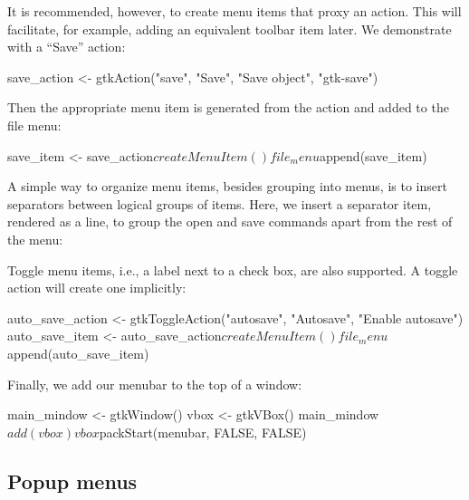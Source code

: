 It is recommended, however, to create menu items that proxy an
action. This will facilitate, for example, adding an equivalent
toolbar item later. We demonstrate with a ``Save'' action:
\begin{Schunk}
\begin{Sinput}
 save_action <- 
   gtkAction("save", "Save", "Save object", "gtk-save")
\end{Sinput}
\end{Schunk}
%
Then the appropriate menu item is generated from the action and added
to the file menu:
\begin{Schunk}
\begin{Sinput}
 save_item <- save_action$createMenuItem()
 file_menu$append(save_item)
\end{Sinput}
\end{Schunk}

A simple way to organize menu items, besides grouping into menus, is
to insert separators between logical groups of items. Here, we insert
a separator item, rendered as a line, to group the open and save
commands apart from the rest of the menu:
\begin{Schunk}
\end{Schunk}

Toggle menu items, i.e., a label next to a check box, are also
supported. A toggle action will create one implicitly:
\begin{Schunk}
\begin{Sinput}
 auto_save_action <- gtkToggleAction("autosave", "Autosave", 
                                     "Enable autosave")
 auto_save_item <- auto_save_action$createMenuItem()
 file_menu$append(auto_save_item)
\end{Sinput}
\end{Schunk}

Finally, we add our menubar to the top of a window:
\begin{Schunk}
\begin{Sinput}
 main_mindow <- gtkWindow()
 vbox <- gtkVBox()
 main_mindow$add(vbox)
 vbox$packStart(menubar, FALSE, FALSE)
\end{Sinput}
\end{Schunk}

\subsection{Popup menus}

